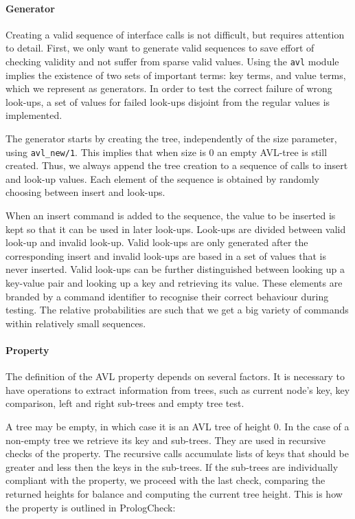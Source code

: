 \documentclass[runningheads,a4paper]{llncs}
\newcommand{\yap}[1]{\lstinline[style=yap]{#1}}
\newcommand{\plqc}[0]{{\sf PrologCheck}}
\begin{document}
\paragraph{\bf Generator}

Creating a valid sequence of interface calls is not difficult, but
requires attention to detail.
%
First, we only want to generate valid sequences to save effort of
checking validity and not suffer from sparse valid values.
%
Using the \yap{avl} module implies the existence of two sets of important
terms: key terms, and value terms, which we represent as generators.
%
In order to test the correct failure of wrong look-ups, a set of values
for failed look-ups disjoint from the regular values is implemented.


The generator starts by creating the tree, independently of the
size parameter, using \yap{avl_new/1}.
%
This implies that when size is 0 an empty AVL-tree is still created.
%
Thus, we always append the tree creation to a sequence of calls to
insert and look-up values.
%
Each element of the sequence is obtained by randomly choosing between
insert and look-ups.


When an insert command is added to the sequence, the value to be
inserted is kept so that it can be used in later look-ups.
%
Look-ups are divided between valid look-up and invalid look-up.
%
Valid look-ups are only generated after the corresponding insert and
invalid look-ups are based in a set of values that is never inserted.
%
Valid look-ups can be further distinguished between looking up a
key-value pair and looking up a key and retrieving its value.
%
These elements are  branded by a command identifier to recognise their
correct behaviour during testing.
%
The relative probabilities are such that we get a big variety of commands within
relatively small sequences.




\paragraph{\bf Property}


The definition of the AVL property depends on several factors.
%
It is necessary to have operations to extract information from trees,
such as current node's key, key comparison, left and
right sub-trees and empty tree test.


A tree may be empty, in which case it is an AVL tree of height 0.
%
In the case of a non-empty tree we retrieve its key and sub-trees.
%
They are used in recursive checks of the property.
%
The recursive calls accumulate lists of keys that should be greater and
less then the keys in the sub-trees.
%
If the sub-trees are individually compliant with the property, we
proceed with the last check, comparing the returned heights for
balance and computing the current tree height.
%
This is how the property is outlined in \plqc{}:
\end{document}
